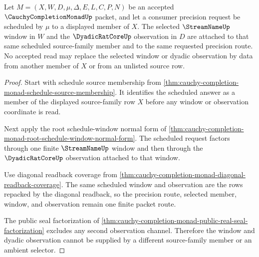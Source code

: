 \begin{theorem}
\label{thm:cauchy-completion-monad-window-observation-source-lock}
Let $M=(X,W,D,\mu,\Delta,E,L,C,P,N)$ be an accepted $\CauchyCompletionMonadUp$ packet, and let a consumer precision request be scheduled by $\mu$ to a displayed member of $X$. The selected $\StreamNameUp$ window in $W$ and the $\DyadicRatCoreUp$ observation in $D$ are attached to that same scheduled source-family member and to the same requested precision route. No accepted read may replace the selected window or dyadic observation by data from another member of $X$ or from an unlisted source row.
\end{theorem}
\begin{proof}
Start with schedule source membership from \autoref{thm:cauchy-completion-monad-schedule-source-membership}. It identifies the scheduled answer as a member of the displayed source-family row $X$ before any window or observation coordinate is read.

Next apply the root schedule-window normal form of \autoref{thm:cauchy-completion-monad-root-schedule-window-normal-form}. The scheduled request factors through one finite $\StreamNameUp$ window and then through the $\DyadicRatCoreUp$ observation attached to that window.

Use diagonal readback coverage from \autoref{thm:cauchy-completion-monad-diagonal-readback-coverage}. The same scheduled window and observation are the rows repacked by the diagonal readback, so the precision route, selected member, window, and observation remain one finite packet route.

The public seal factorization of \autoref{thm:cauchy-completion-monad-public-real-seal-factorization} excludes any second observation channel. Therefore the window and dyadic observation cannot be supplied by a different source-family member or an ambient selector.
\end{proof}

